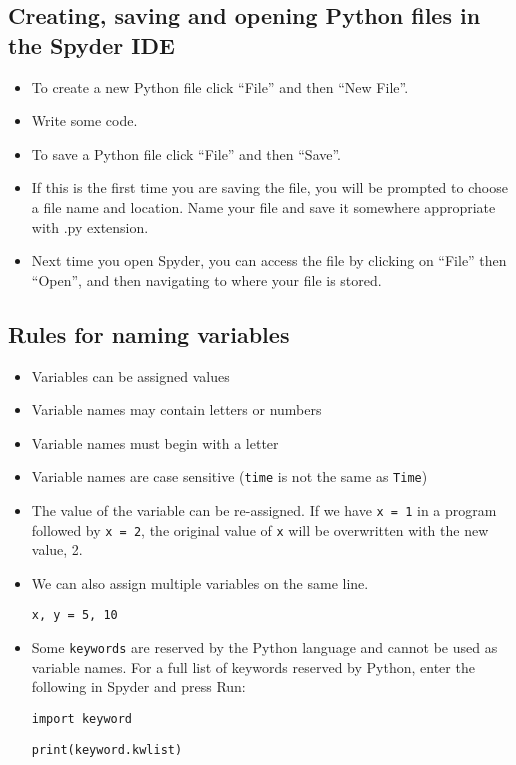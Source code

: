 \documentclass[12pt]{article}
\begin{document}
\subsection*{Creating, saving and opening Python files in the Spyder IDE}
     
\begin{itemize}
    \item To create a new Python file click ``File'' and then ``New File''.
    \item Write some code.
    \item To save a Python file click ``File'' and then ``Save''.
    \item If this is the first time you are saving the file, you will be prompted to choose a file name and location. Name your file and save it somewhere appropriate with .py extension. 
    \item Next time you open Spyder, you can access the file by clicking on ``File'' then ``Open'', and then navigating to where your file is stored.
\end{itemize}
    

\subsection*{Rules for naming variables}
	\begin{itemize}
        \item Variables can be assigned values
        \item Variable names may contain letters or numbers
        \item Variable names must begin with a letter
        \item Variable names are case sensitive ({\tt time} is not the same as {\tt Time})
        \item The value of the variable can be re-assigned. If we have {\tt x = 1} in a program followed by {\tt x = 2}, the original value of {\tt x} will be overwritten with the new value, 2. 
        \item We can also assign multiple variables on the same line.
	
	    \vspace{0.5em}
		{\tt x, y  = 5, 10}
		\vspace{0.5em}
		
        \item Some {\tt keywords} are reserved by the Python language and cannot be used as variable names. For a full list of keywords reserved by Python, enter the following in Spyder and press Run:
		
		\vspace{0.5em}
		{\tt import keyword}
		
		{\tt print(keyword.kwlist)}
		\vspace{0.5em}
    \end{itemize}
    
\end{document}
